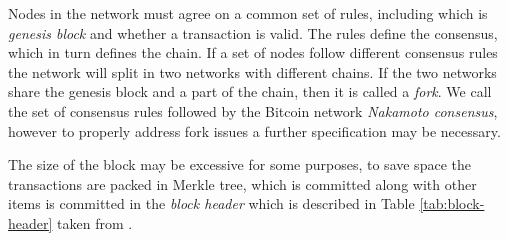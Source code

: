 Nodes in the network must agree on a common set of rules, including which is \textit{genesis block} and whether a transaction is valid. The rules define the consensus, which in turn defines the chain. If a set of nodes follow different consensus rules the network will split in two networks with different chains. If the two networks share the genesis block and a part of the chain, then it is called a \textit{fork}. We call the set of consensus rules followed by the Bitcoin network \textit{Nakamoto consensus}, however to properly address fork issues a further specification may be necessary. 

The size of the block may be excessive for some purposes, to save space the transactions are packed in Merkle tree, which is committed along with other items is committed in the \textit{block header} which is described in Table \ref{tab:block-header} taken from \cite{BitcoinDev}.

